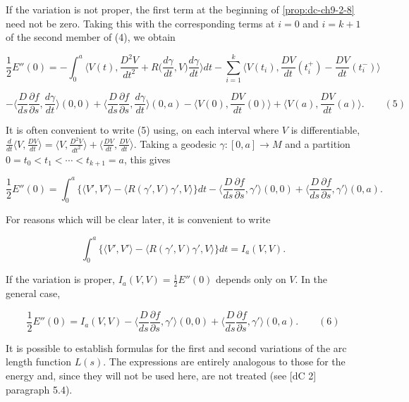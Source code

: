 \begin{remark}[Remark 2.9]
  \label{rem:dc-ch9-2-9}
  If the variation is not proper, the first term at the beginning of \cref{prop:dc-ch9-2-8}
  need not be zero. Taking this with the corresponding terms at $i=0$ and $i=k+1$ of
  the second member of (4), we obtain
  
  $$
  \frac{1}{2}E''(0)=-\int_0^a\Big\langle V(t),\frac{D^2 V}{dt^2}+R\Big(\frac{d\gamma}{dt},V\Big)\frac{d\gamma}{dt}\Big\rangle dt-\sum_{i=1}^k\Big\langle V(t_i),\frac{DV}{dt}(t_i^+)-\frac{DV}{dt}(t_i^-)\Big\rangle
  $$
  
  $$
  -\Big\langle\frac{D}{ds}\frac{\partial f}{\partial s},\frac{d\gamma}{dt}\Big\rangle(0,0)+\Big\langle\frac{D}{ds}\frac{\partial f}{\partial s},\frac{d\gamma}{dt}\Big\rangle(0,a)-\Big\langle V(0),\frac{DV}{dt}(0)\Big\rangle+\Big\langle V(a),\frac{DV}{dt}(a)\Big\rangle.\qquad(5)
  $$
\end{remark}

\begin{remark}
  \label{rem:dc-ch9-2-10}
  It is often convenient to write (5) using, on each interval where $V$ is
  differentiable,
  $\frac{d}{dt}\langle V,\frac{DV}{dt}\rangle=\langle V,\frac{D^2 V}{dt^2}\rangle+\langle\frac{DV}{dt},\frac{DV}{dt}\rangle$.
  Taking a geodesic $\gamma:[0,a]\to M$ and a partition
  $0=t_0<t_1<\cdots<t_{k+1}=a$, this gives
  
  $$
  \frac{1}{2}E''(0)=\int_0^a\{\langle V',V'\rangle-\langle R(\gamma',V)\gamma',V\rangle\}dt-\Big\langle\frac{D}{ds}\frac{\partial f}{\partial s},\gamma'\Big\rangle(0,0)+\Big\langle\frac{D}{ds}\frac{\partial f}{\partial s},\gamma'\Big\rangle(0,a).
  $$
  
  For reasons which will be clear later, it is convenient to write
  
  $$
  \int_0^a\{\langle V',V'\rangle-\langle R(\gamma',V)\gamma',V\rangle\}dt=I_a(V,V).
  $$
  
  If the variation is proper, $I_a(V,V)=\frac{1}{2}E''(0)$ depends only on $V$. In
  the general case,
  
  $$
  \frac{1}{2}E''(0)=I_a(V,V)-\Big\langle\frac{D}{ds}\frac{\partial f}{\partial s},\gamma'\Big\rangle(0,0)+\Big\langle\frac{D}{ds}\frac{\partial f}{\partial s},\gamma'\Big\rangle(0,a).\qquad(6)
  $$
\end{remark}

\begin{remark}[Remark 2.11]
  \label{rem:dc-ch9-2-11}
  It is possible to establish formulas for the first and second variations of the
  arc length function $L(s)$. The expressions are entirely analogous to those for the
  energy and, since they will not be used here, are not treated (see [dC 2]
  paragraph 5.4).
\end{remark}

